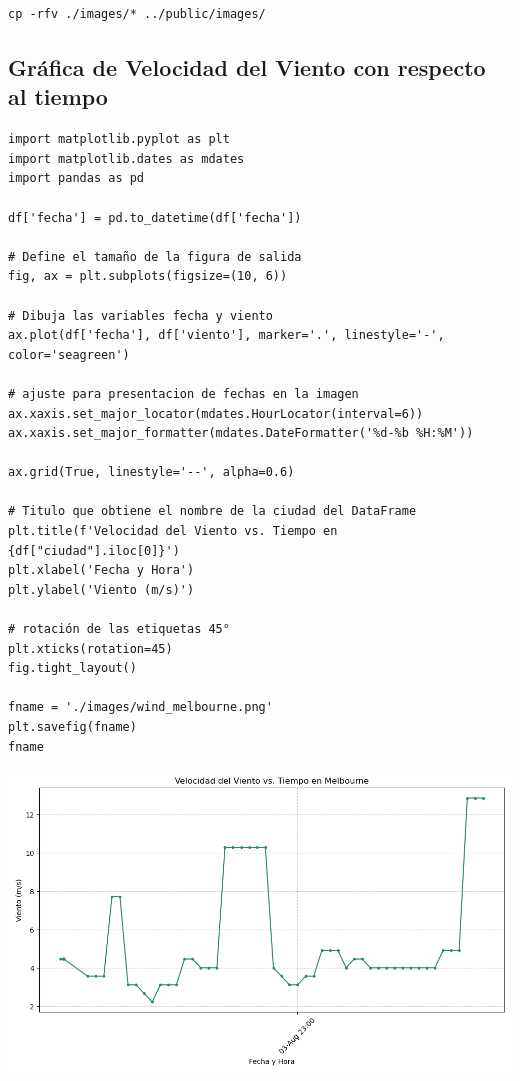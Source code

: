 \documentclass[11pt]{article}
\begin{document}
\begin{verbatim}
cp -rfv ./images/* ../public/images/
\end{verbatim}


\subsection{Gráfica de Velocidad del Viento con respecto al tiempo}
\label{sec:orgec24f17}

\begin{verbatim}
import matplotlib.pyplot as plt
import matplotlib.dates as mdates
import pandas as pd

df['fecha'] = pd.to_datetime(df['fecha'])

# Define el tamaño de la figura de salida
fig, ax = plt.subplots(figsize=(10, 6))

# Dibuja las variables fecha y viento
ax.plot(df['fecha'], df['viento'], marker='.', linestyle='-', color='seagreen')

# ajuste para presentacion de fechas en la imagen
ax.xaxis.set_major_locator(mdates.HourLocator(interval=6))
ax.xaxis.set_major_formatter(mdates.DateFormatter('%d-%b %H:%M'))

ax.grid(True, linestyle='--', alpha=0.6)

# Titulo que obtiene el nombre de la ciudad del DataFrame
plt.title(f'Velocidad del Viento vs. Tiempo en {df["ciudad"].iloc[0]}')
plt.xlabel('Fecha y Hora')
plt.ylabel('Viento (m/s)')

# rotación de las etiquetas 45°
plt.xticks(rotation=45)
fig.tight_layout()

fname = './images/wind_melbourne.png'
plt.savefig(fname)
fname
\end{verbatim}

\begin{center}
\includegraphics[width=.9\linewidth]{./images/wind_melbourne.png}
\end{center}
\end{document}
